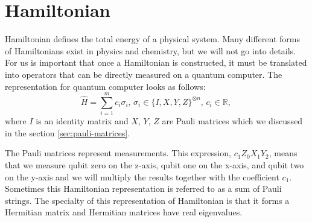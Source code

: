 \section{Hamiltonian}
Hamiltonian defines the total energy of a physical system. Many different forms of Hamiltonians exist in physics and chemistry, but we will not go into details. For us is important that once a Hamiltonian is constructed, it must be translated into operators that can be directly measured on a quantum computer. The representation for quantum computer looks as follows:
$$\hat{H} = \sum_{i=1}^{m}c_i\sigma_i \text{, } \sigma_i \in \{I, X, Y, Z\}^{\otimes n}\text{, } c_i \in \mathbb{R} \text{, }$$ 
where $I$ is an identity matrix and $X$, $Y$, $Z$ are Pauli matrices which we discussed in the section \ref{sec:pauli-matrices}.~\cite{fedorov2021vqe}

The Pauli matrices represent measurements. This expression, $c_{1}Z_{0}X_{1}Y_{2}$, means that we measure qubit zero on the z-axis, qubit one on the x-axis, and qubit two on the y-axis and we will multiply the results together with the coefficient $c_{1}$. Sometimes this Hamiltonian representation is referred to as a sum of Pauli strings. The specialty of this representation of Hamiltonian is that it forms a Hermitian matrix and Hermitian matrices have real eigenvalues.